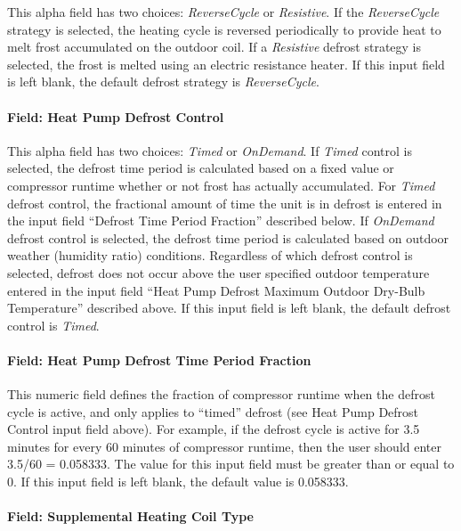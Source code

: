 This alpha field has two choices: \emph{ReverseCycle} or \emph{Resistive}. If the \emph{ReverseCycle} strategy is selected, the heating cycle is reversed periodically to provide heat to melt frost accumulated on the outdoor coil. If a \emph{Resistive} defrost strategy is selected, the frost is melted using an electric resistance heater. If this input field is left blank, the default defrost strategy is \emph{ReverseCycle}.

\paragraph{Field: Heat Pump Defrost Control}\label{field-heat-pump-defrost-control}

This alpha field has two choices: \emph{Timed} or \emph{OnDemand}. If \emph{Timed} control is selected, the defrost time period is calculated based on a fixed value or compressor runtime whether or not frost has actually accumulated. For \emph{Timed} defrost control, the fractional amount of time the unit is in defrost is entered in the input field ``Defrost Time Period Fraction'' described below. If \emph{OnDemand} defrost control is selected, the defrost time period is calculated based on outdoor weather (humidity ratio) conditions. Regardless of which defrost control is selected, defrost does not occur above the user specified outdoor temperature entered in the input field ``Heat Pump Defrost Maximum Outdoor Dry-Bulb Temperature'' described above. If this input field is left blank, the default defrost control is \emph{Timed}.

\paragraph{Field: Heat Pump Defrost Time Period Fraction}\label{field-heat-pump-defrost-time-period-fraction}

This numeric field defines the fraction of compressor runtime when the defrost cycle is active, and only applies to ``timed'' defrost (see Heat Pump Defrost Control input field above). For example, if the defrost cycle is active for 3.5 minutes for every 60 minutes of compressor runtime, then the user should enter 3.5/60 = 0.058333. The value for this input field must be greater than or equal to 0. If this input field is left blank, the default value is 0.058333.

\paragraph{Field: Supplemental Heating Coil Type}\label{field-supplemental-heating-coil-type}

